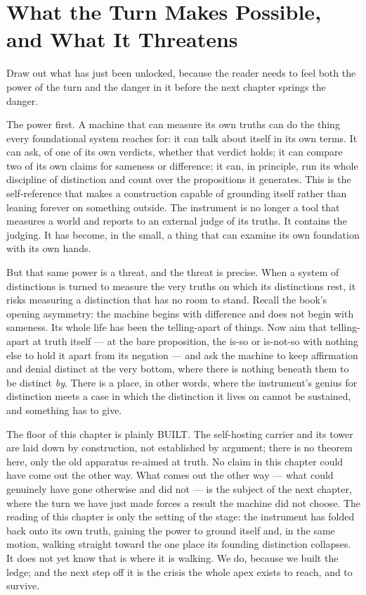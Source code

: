 \section{What the Turn Makes Possible, and What It Threatens}

Draw out what has just been unlocked, because the reader needs to feel both the power of the turn and the danger
in it before the next chapter springs the danger.

The power first. A machine that can measure its own truths can do the thing every foundational system reaches for:
it can talk about itself in its own terms. It can ask, of one of its own verdicts, whether that verdict holds; it
can compare two of its own claims for sameness or difference; it can, in principle, run its whole discipline of
distinction and count over the propositions it generates. This is the self-reference that makes a construction
capable of grounding itself rather than leaning forever on something outside. The instrument is no longer a tool
that measures a world and reports to an external judge of its truths. It contains the judging. It has become, in
the small, a thing that can examine its own foundation with its own hands.

But that same power is a threat, and the threat is precise. When a system of distinctions is turned to measure the
very truths on which its distinctions rest, it risks measuring a distinction that has no room to stand. Recall the
book's opening asymmetry: the machine begins with difference and does not begin with sameness. Its whole life has
been the telling-apart of things. Now aim that telling-apart at truth itself --- at the bare proposition, the is-so
or is-not-so with nothing else to hold it apart from its negation --- and ask the machine to keep affirmation and
denial distinct at the very bottom, where there is nothing beneath them to be distinct \emph{by}. There is a place,
in other words, where the instrument's genius for distinction meets a case in which the distinction it lives on
cannot be sustained, and something has to give.

The floor of this chapter is plainly BUILT. The self-hosting carrier and its tower are laid down by construction,
not established by argument; there is no theorem here, only the old apparatus re-aimed at truth. No claim in this
chapter could have come out the other way. What comes out the other way --- what could genuinely have gone
otherwise and did not --- is the subject of the next chapter, where the turn we have just made forces a result the
machine did not choose. The reading of this chapter is only the setting of the stage: the instrument has folded
back onto its own truth, gaining the power to ground itself and, in the same motion, walking straight toward the
one place its founding distinction collapses. It does not yet know that is where it is walking. We do, because we
built the ledge; and the next step off it is the crisis the whole apex exists to reach, and to survive.

